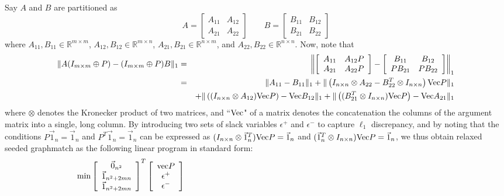 \documentclass[12pt]{article}
\newcommand{\ve}{\textup{Vec}}
\newcommand{\R}{\mathbb{R}}
\begin{document}
Say $A$ and $B$ are partitioned as
\[  A =\left [
\begin{array}{cc} A_{11} & A_{12} \\ A_{21} & A_{22} \end{array} \right ]
\ \ \ \ \ \ \ \ \ B =\left [
\begin{array}{cc} B_{11} & B_{12} \\ B_{21} & B_{22} \end{array} \right ]
\]
where $A_{11},B_{11}\in \R^{m \times m}$,
$A_{12},B_{12}\in \R^{m \times n}$, $A_{21},B_{21}\in \R^{n \times m}$, and
$A_{22},B_{22}\in \R^{n \times n}$. Now, note that
\begin{eqnarray*}  \| A(I_{m \times m}\oplus P)-(I_{m \times m}\oplus P)B\|_1
&=& \left \|
\left [
\begin{array}{cc} A_{11} & A_{12}P \\ A_{21} & A_{22}P \end{array}
\right ]
-
\left [
\begin{array}{cc} B_{11} & B_{12} \\ PB_{21} & PB_{22} \end{array}
\right ] \right \|_1 \\
&=& \|A_{11}-B_{11}\|_1 + \| \left ( I_{n \times n} \otimes A_{22}
 -B^T_{22} \otimes I_{n \times n} \right ) \ve P \|_1
\\ & &   + \| \left ( ( I_{n \times n} \otimes  A_{12} ) \ve P \right )
- \ve B_{12} \|_1
+ \| \left (  ( B^T_{21} \otimes I_{n \times n} ) \ve P \right ) - \ve A_{21} \|_1
\end{eqnarray*}
where $\otimes$ denotes the Kronecker product of two matrices, and ``$\ve$"
of a matrix denotes the concatenation the columns of the argument matrix into a single,
long column. By introducing two sets of slack variables $\epsilon^+$ and $\epsilon^-$
to capture $\ell_1$ discrepancy, and by noting that the conditions $P \vec{1}_n=\vec{1}_n$
and $P^T \vec{1}_n=\vec{1}_n$ can be expressed as
$(I_{n \times n}  \otimes \vec{1}^T_{n}) \ve P = \vec{1}_n$ and
$(\vec{1}^T_{n} \otimes I_{n \times n}) \ve P = \vec{1}_n$, we thus obtain
relaxed seeded graphmatch as the following linear program in standard form:
\[ \min
\left [ \begin{array}{c} \vec{0}_{n^2} \\ \vec{1}_{n^2+2mn} \\ \vec{1}_{n^2+2mn} \end{array}
\right ] ^T
\left [ \begin{array}{c} \textup{vec}P \\ \epsilon^+ \\ \epsilon^- \end{array}
\right ] \ \ \ \ \ \ \ \ \ \ \ \ \ \ \ \ \ \ \ \ \ \ \ \ \ \ \ \ \ \ \ \ \ \
 \ \ \ \ \ \ \ \ \ \ \ \ \ \ \ \ \ \ \ \ \ \ \ \ \ \ \ \ \ \ \ \ \ \ \ \ \ \ \
 \ \ \ \ \ \ \ \ \ \ \ \ \ \ \ \ \ \ \
\]
\end{document}

